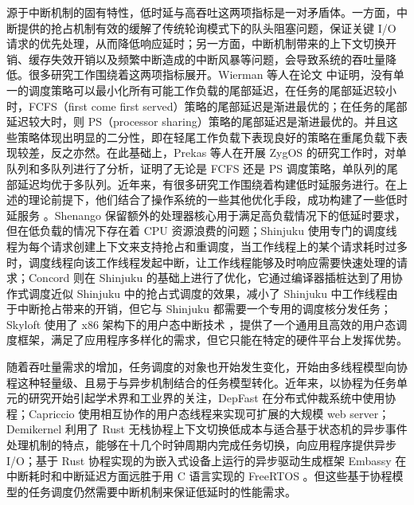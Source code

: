 源于中断机制的固有特性，低时延与高吞吐这两项指标是一对矛盾体。一方面，中断提供的抢占机制有效的缓解了传统轮询模式下的队头阻塞问题，保证关键 I/O 请求的优先处理，从而降低响应延时；另一方面，中断机制带来的上下文切换开销、缓存失效开销以及频繁中断造成的中断风暴等问题，会导致系统的吞吐量降低。很多研究工作围绕着这两项指标展开。Wierman 等人在论文 \cite{wierman2012tail} 中证明，没有单一的调度策略可以最小化所有可能工作负载的尾部延迟，在任务的尾部延迟较小时，FCFS（first come first served）策略的尾部延迟是渐进最优的；在任务的尾部延迟较大时，则 PS（processor sharing）策略的尾部延迟是渐进最优的。并且这些策略体现出明显的二分性，即在轻尾工作负载下表现良好的策略在重尾负载下表现较差，反之亦然。在此基础上，Prekas 等人在开展 ZygOS \cite{prekas2017zygos} 的研究工作时，对单队列和多队列进行了分析，证明了无论是 FCFS 还是 PS 调度策略，单队列的尾部延迟均优于多队列。近年来，有很多研究工作围绕着构建低时延服务进行。在上述的理论前提下，他们结合了操作系统的一些其他优化手段，成功构建了一些低时延服务 \cite{Adam2014, iyer2023achieving, kaffes2019shinjuku, ousterhout2019shenango, jia2024skyloft}。Shenango 保留额外的处理器核心用于满足高负载情况下的低延时要求\cite{ousterhout2019shenango}，但在低负载的情况下存在着 CPU 资源浪费的问题；Shinjuku \cite{kaffes2019shinjuku} 使用专门的调度线程为每个请求创建上下文来支持抢占和重调度，当工作线程上的某个请求耗时过多时，调度线程向该工作线程发起中断，让工作线程能够及时响应需要快速处理的请求；Concord \cite{iyer2023achieving} 则在 Shinjuku 的基础上进行了优化，它通过编译器插桩达到了用协作式调度近似 Shinjuku 中的抢占式调度的效果，减小了 Shinjuku 中工作线程由于中断抢占带来的开销，但它与 Shinjuku 都需要一个专用的调度核分发任务；Skyloft \cite{jia2024skyloft} 使用了 x86 架构下的用户态中断技术 \cite{x86_uintr}，提供了一个通用且高效的用户态调度框架，满足了应用程序多样化的需求，但它只能在特定的硬件平台上发挥优势。

随着吞吐量需求的增加，任务调度的对象也开始发生变化，开始由多线程模型向协程这种轻量级、且易于与异步机制结合的任务模型转化。近年来，以协程为任务单元的研究开始引起学术界和工业界的关注，DepFast \cite{Xuhao2022} 在分布式仲裁系统中使用协程；Capriccio \cite{vonBehren2003} 使用相互协作的用户态线程来实现可扩展的大规模 web server；Demikernel \cite{zhang2021demikernel} 利用了 Rust 无栈协程上下文切换低成本与适合基于状态机的异步事件处理机制的特点，能够在十几个时钟周期内完成任务切换，向应用程序提供异步 I/O；基于 Rust 协程实现的为嵌入式设备上运行的异步驱动生成框架 Embassy \cite{embassy} 在中断耗时和中断延迟方面远胜于用 C 语言实现的 FreeRTOS \cite{embassy_vs_freetos}。但这些基于协程模型的任务调度仍然需要中断机制来保证低延时的性能需求。


